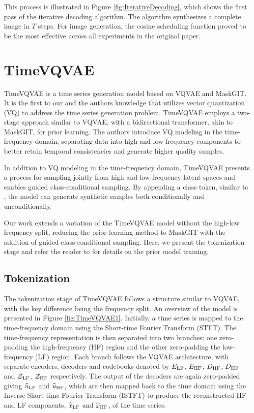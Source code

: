 \documentclass[../../thesis.tex]{subfiles}
\begin{document}
This process is illustrated in Figure \ref{fig:IterativeDecoding}, which shows the first pass of the iterative decoding algorithm. The algorithm synthesizes a complete image in $T$ steps. For image generation, the cosine scheduling function proved to be the most effective across all experiments in the original paper.

\section{TimeVQVAE}

TimeVQVAE is a time series generation model based on VQVAE and MaskGIT. It is the first to our and the authors knowledge that utilizes vector quantization (VQ) to address the time series generation problem. TimeVQVAE employs a two-stage approach similar to VQVAE, with a bidirectional transformer, akin to MaskGIT, for prior learning. The authors introduce VQ modeling in the time-frequency domain, separating data into high and low-frequency components to better retain temporal consistencies and generate higher quality samples.\newline

In addition to VQ modeling in the time-frequency domain, TimeVQVAE presents a process for sampling jointly from high and low-frequency latent spaces and enables guided class-conditional sampling. By appending a class token, similar to \cite{dosovitskiy2021image}, the model can generate synthetic samples both conditionally and unconditionally.\newline

Our work extends a variation of the TimeVQVAE model without the high-low frequency split, reducing the prior learning method to MaskGIT with the addition of guided class-conditional sampling. Here, we present the tokenization stage and refer the reader to \cite{VQVAE} for details on the prior model training.

\subsection{Tokenization}
The tokenization stage of TimeVQVAE follows a structure similar to VQVAE, with the key difference being the frequency split. An overview of the model is presented in Figure \ref{fig:TimeVQVAE1}. Initially, a time series is mapped to the time-frequency domain using the Short-time Fourier Transform (STFT). The time-frequency representation is then separated into two branches: one zero-padding the high-frequency (HF) region and the other zero-padding the low-frequency (LF) region. Each branch follows the VQVAE architecture, with separate encoders, decoders and codebooks denoted by $E_{\mathrm{LF}}$, $E_{\mathrm{HF}}$, $D_{\mathrm{HF}}$, $D_{\mathrm{HF}}$ and $\mathcal{Z}_{\mathrm{LF}}$, $\mathcal{Z}_{\mathrm{HF}}$ respectively. The output of the decoders are again zero-padded giving $\widehat{u}_{\mathrm{LF}}$ and $\widehat{u}_{\mathrm{HF}}$, which are then mapped back to the time domain using the Inverse Short-time Fourier Transform (ISTFT) to produce the reconstructed HF and LF components, $\widehat{x}_{\mathrm{LF}}$ and $\widehat{x}_{\mathrm{HF}}$, of the time series.
\end{document}

